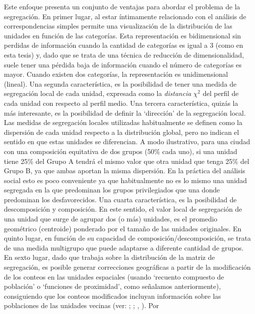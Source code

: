 \documentclass[
  spanish,
  a4paper,%
  chapterprefix=true,%
  DIV=calc,%
  twoside]{scrbook}%
\begin{document}
Este enfoque presenta un conjunto de ventajas para abordar el problema
de la segregación. En primer
lugar, al estar íntimamente relacionado con el análisis de
correspondencias simples permite una visualización de la distribución de
las unidades en función de las categorías. Esta representación es
bidimensional sin perdidas de información cuando la cantidad de
categorías es igual a 3 (como en esta tesis) y, dado que se trata de una
técnica de reducción de dimensionalidad, suele tener una pérdida baja de
información cuando el número de categorías es mayor. Cuando existen dos
categorías, la representación es unidimensional (lineal).
Una segunda característica, es la posibilidad de
tener una medida de segregación local de cada unidad, expresada como la
\emph{distancia} \(\chi^2\) del perfil de cada unidad con respecto al perfil
medio. Una tercera característica, quizás la más
interesante, es la posibilidad de definir la `dirección' de la
segregación local. Las medidas de segregación locales utilizadas
habitualmente se definen como la dispersión de cada unidad respecto a la
distribución global, pero no indican el sentido en que estas unidades se
diferencian. A modo ilustrativo, para una ciudad con una composición
equitativa de dos grupos (50\% cada uno), si una unidad tiene 25\% del
Grupo A tendrá el mismo valor que otra unidad que tenga 25\% del Grupo B,
ya que ambas aportan la misma dispersión. En la práctica del análisis
social esto es poco conveniente ya que habitualmente no es lo mismo una
unidad segregada en la que predominan los grupos privilegiados que una
donde predominan los desfavorecidos.
Una cuarta característica, es la
posibilidad de descomposición y composición. En este sentido, el valor
local de segregación de una unidad que surge de agrupar dos (o más)
unidades, es el promedio geométrico (centroide) ponderado por el tamaño
de las unidades originales. En quinto lugar, en
función de su capacidad de composición/descomposición, se trata de una
medida multigrupo que puede adaptarse a diferente cantidad de grupos.
En sexto lugar, dado que
trabaja sobre la distribución de la matriz de segregación, es posible
generar correcciones geográficas a partir de la modificación de los
conteos en las unidades espaciales (usando `recuento compuesto de
población' o `funciones de proximidad', como señalamos anteriormente),
consiguiendo que los conteos modificados incluyan información sobre las
poblaciones de las unidades vecinas (ver: ; ; , ). Por
\end{document}
